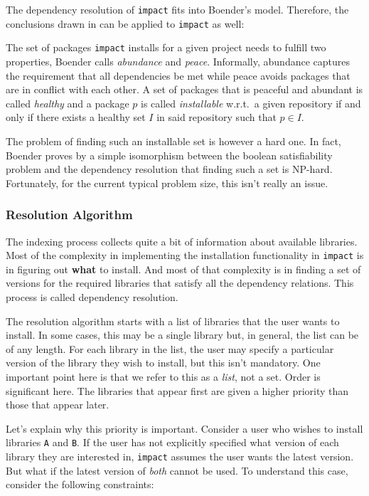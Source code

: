 \documentclass[11pt,a4paper,twocolumn]{article}
\newcommand{\code}[1]{\texttt{#1}} %
\begin{document}
The dependency resolution of \code{impact} fits into Boender's model.
Therefore, the conclusions drawn in \parencite{boender2011formal} can be
applied to \code{impact} as well:

The set of packages \code{impact} installs for a given project needs to
fulfill two properties, Boender calls \emph{abundance} and \emph{peace}.
Informally, abundance captures the requirement that all dependencies
be met while peace avoids packages that are in conflict with each
other.  A set of packages that is peaceful and abundant is called
\emph{healthy} and a package $p$ is called \emph{installable} w.r.t.\ a
given repository if and only if there exists a healthy set $I$ in said
repository such that $p \in I$.

The problem of finding such an installable set is however a hard one.
In fact, Boender proves by a simple isomorphism between the boolean
satisfiability problem and the dependency resolution that finding such
a set is NP-hard.  Fortunately, for the current typical problem size,
this isn't really an issue.

\subsubsection{Resolution Algorithm}
\label{sec:algorithm}

The indexing process collects quite a bit of information about
available libraries.  Most of the complexity in implementing the
installation functionality in \code{impact} is in figuring out
\textbf{what} to install.  And most of that complexity is in finding a set
of versions for the required libraries that satisfy all the dependency
relations.  This process is called dependency resolution.

The resolution algorithm starts with a list of libraries that the user
wants to install.  In some cases, this may be a single library but, in
general, the list can be of any length.  For each library in the list,
the user may specify a particular version of the library they wish to
install, but this isn't mandatory.  One important point here is that
we refer to this as a \emph{list}, not a set.  Order is significant
here.  The libraries that appear first are given a higher priority
than those that appear later.

Let's explain why this priority is important.  Consider a user who
wishes to install libraries \code{A} and \code{B}.  If the user has
not explicitly specified what version of each library they are
interested in, \code{impact} assumes the user wants the latest
version.  But what if the latest version of \emph{both} cannot be
used.  To understand this case, consider the following constraints:
\end{document}
